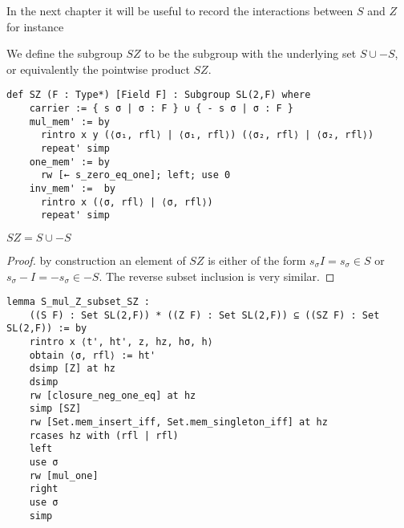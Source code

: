 In the next chapter it will be useful to record the interactions between $S$ and $Z$ for instance


\begin{definition}
    \label{SpecialSubgroups.SZ}
    \leanok
    We define the subgroup $SZ$ to be the subgroup with the underlying set $S \cup -S$, or equivalently the pointwise product $SZ$.
\end{definition}
\begin{footnotesize}
\begin{verbatim}
def SZ (F : Type*) [Field F] : Subgroup SL(2,F) where
    carrier := { s σ | σ : F } ∪ { - s σ | σ : F }
    mul_mem' := by
      rintro x y (⟨σ₁, rfl⟩ | ⟨σ₁, rfl⟩) (⟨σ₂, rfl⟩ | ⟨σ₂, rfl⟩)
      repeat' simp
    one_mem' := by
      rw [← s_zero_eq_one]; left; use 0
    inv_mem' :=  by
      rintro x (⟨σ, rfl⟩ | ⟨σ, rfl⟩)
      repeat' simp
\end{verbatim}
\end{footnotesize}


\begin{corollary}
\label{SpecialSubgroups.S_mul_Z_subset_SZ}
$SZ = S \cup -S$
\leanok
\end{corollary}
\begin{proof}
\leanok
    by construction an element of $SZ$ is either of the form $s_\sigma  I = s_\sigma \in S$ or $s_\sigma -I = -s_\sigma\in -S$. The reverse subset inclusion is very similar.
\end{proof}
\begin{footnotesize}
\begin{verbatim}
lemma S_mul_Z_subset_SZ :
    ((S F) : Set SL(2,F)) * ((Z F) : Set SL(2,F)) ⊆ ((SZ F) : Set SL(2,F)) := by
    rintro x ⟨t', ht', z, hz, hσ, h⟩
    obtain ⟨σ, rfl⟩ := ht'
    dsimp [Z] at hz
    dsimp
    rw [closure_neg_one_eq] at hz
    simp [SZ]
    rw [Set.mem_insert_iff, Set.mem_singleton_iff] at hz
    rcases hz with (rfl | rfl)
    left
    use σ
    rw [mul_one]
    right
    use σ
    simp
\end{verbatim}
\end{footnotesize}

